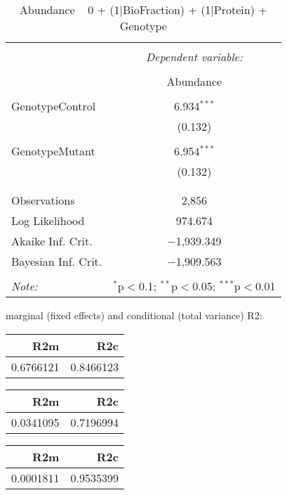 \documentclass[11pt]{report}
\begin{document}
\begin{table}[!htbp] \centering 
  \caption{Abundance ~ 0 + (1|BioFraction) + (1|Protein) + Genotype} 
  \label{} 
\begin{tabular}{@{\extracolsep{5pt}}lc} 
\\[-1.8ex]\hline 
\hline \\[-1.8ex] 
 & \multicolumn{1}{c}{\textit{Dependent variable:}} \\ 
\cline{2-2} 
\\[-1.8ex] & Abundance \\ 
\hline \\[-1.8ex] 
 GenotypeControl & 6.934$^{***}$ \\ 
  & (0.132) \\ 
  & \\ 
 GenotypeMutant & 6.954$^{***}$ \\ 
  & (0.132) \\ 
  & \\ 
\hline \\[-1.8ex] 
Observations & 2,856 \\ 
Log Likelihood & 974.674 \\ 
Akaike Inf. Crit. & $-$1,939.349 \\ 
Bayesian Inf. Crit. & $-$1,909.563 \\ 
\hline 
\hline \\[-1.8ex] 
\textit{Note:}  & \multicolumn{1}{r}{$^{*}$p$<$0.1; $^{**}$p$<$0.05; $^{***}$p$<$0.01} \\ 
\end{tabular} 
\end{table} 
marginal (fixed effects) and conditional (total variance) R2:

\begin{tabular}{r|r}
\hline
R2m & R2c\\
\hline
0.6766121 & 0.8466123\\
\hline
\end{tabular}

\begin{tabular}{r|r}
\hline
R2m & R2c\\
\hline
0.0341095 & 0.7196994\\
\hline
\end{tabular}

\begin{tabular}{r|r}
\hline
R2m & R2c\\
\hline
0.0001811 & 0.9535399\\
\hline
\end{tabular}
\end{document}
